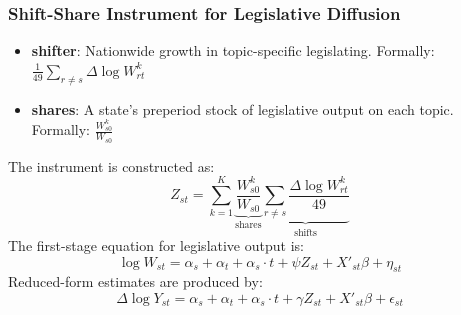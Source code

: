 \documentclass{beamer}
\begin{document}
\begin{frame}
    \frametitle{Shift-Share Instrument for Legislative Diffusion}
    \footnotesize
    \begin{itemize}
            \item \textbf{shifter}: Nationwide growth in topic-specific legislating. Formally: $\frac{1}{49}\sum_{r \neq s}\Delta \log W_{rt}^k$
            \item \textbf{shares}: A state's preperiod stock of legislative output on each topic. Formally: $\frac{W_{s0}^k}{W_{s0}}$
    \end{itemize}
    \vspace{0.5em} %
    The instrument is constructed as:
    \begin{equation}
        Z_{st} = \sum_{k=1}^{K} \underbrace{\frac{W_{s0}^k}{W_{s0}}}_{\text{shares}} \underbrace{\sum_{r \neq s} \frac{\Delta \log W_{rt}^k}{49}}_{\text{shifts}}
    \end{equation}
    The first-stage equation for legislative output is:
    \begin{equation}\label{first_stage}
        \log W_{st} = \alpha_s + \alpha_t + \alpha_s \cdot t + \psi Z_{st} + X'_{st}\beta + \eta_{st}
    \end{equation}
    Reduced-form estimates are produced by:
    \begin{equation}\label{reduced_form}
        \Delta \log Y_{st} = \alpha_s + \alpha_t + \alpha_s \cdot t + \gamma Z_{st} + X'_{st}\beta + \epsilon_{st}
    \end{equation}
\end{frame}
\end{document}
